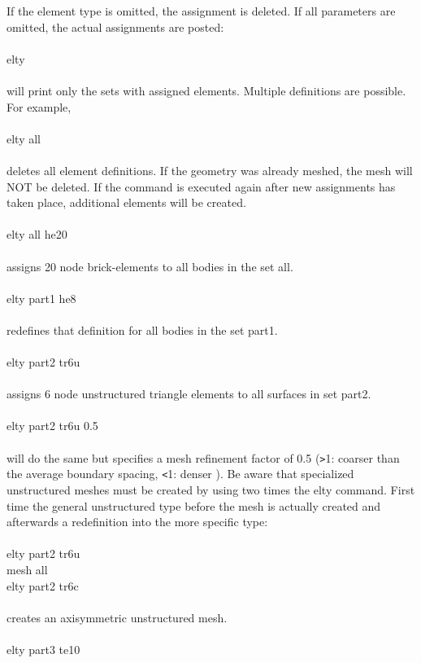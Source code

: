 \documentclass{article}
\begin{document}
If the element type is omitted, the assignment is deleted. If all parameters are 
omitted, the actual assignments are posted:\\\\
elty\\\\
will print only the sets with assigned elements. Multiple definitions are possible. For example,\\\\
elty all\\\\
deletes all element definitions. If the geometry was already meshed, the mesh will NOT be deleted. If the  command is executed again after new assignments has taken place, additional elements will be created.\\\\
elty all he20\\\\
assigns 20 node brick-elements to all bodies in the set all.\\\\
elty part1 he8\\\\
redefines that definition for all bodies in the set part1.\\\\
elty part2 tr6u\\\\
assigns 6 node unstructured triangle elements to all surfaces in set part2.\\\\
elty part2 tr6u 0.5\\\\
will do the same but specifies a mesh refinement factor of 0.5 (\verb_>_1: coarser than the average boundary spacing, \verb_<_1: denser ). Be aware that specialized unstructured meshes must be created by using two times the elty command. First time the general unstructured type before the mesh is actually created and afterwards a redefinition into the more specific type:\\\\
elty part2 tr6u\\
mesh all\\
elty part2 tr6c\\\\
creates an axisymmetric unstructured mesh.\\\\
elty part3 te10\\\\
\end{document}
